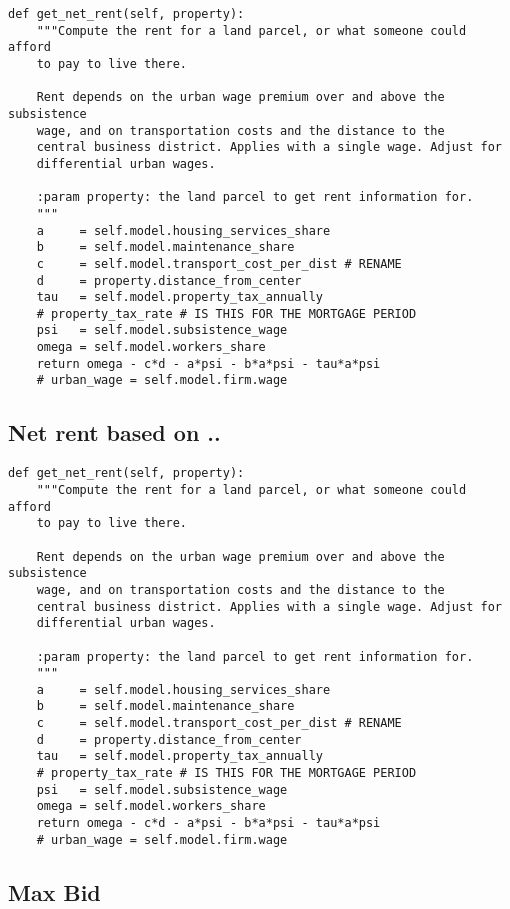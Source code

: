 \begin{lstlisting}
def get_net_rent(self, property):
    """Compute the rent for a land parcel, or what someone could afford
    to pay to live there. 

    Rent depends on the urban wage premium over and above the subsistence
    wage, and on transportation costs and the distance to the
    central business district. Applies with a single wage. Adjust for
    differential urban wages.

    :param property: the land parcel to get rent information for.
    """
    a     = self.model.housing_services_share
    b     = self.model.maintenance_share
    c     = self.model.transport_cost_per_dist # RENAME
    d     = property.distance_from_center 
    tau   = self.model.property_tax_annually 
    # property_tax_rate # IS THIS FOR THE MORTGAGE PERIOD
    psi   = self.model.subsistence_wage
    omega = self.model.workers_share
    return omega - c*d - a*psi - b*a*psi - tau*a*psi
    # urban_wage = self.model.firm.wage
\end{lstlisting}


\subsection{Net rent based on ..}

\begin{lstlisting}
def get_net_rent(self, property):
    """Compute the rent for a land parcel, or what someone could afford
    to pay to live there. 

    Rent depends on the urban wage premium over and above the subsistence
    wage, and on transportation costs and the distance to the
    central business district. Applies with a single wage. Adjust for
    differential urban wages.

    :param property: the land parcel to get rent information for.
    """
    a     = self.model.housing_services_share
    b     = self.model.maintenance_share
    c     = self.model.transport_cost_per_dist # RENAME
    d     = property.distance_from_center 
    tau   = self.model.property_tax_annually 
    # property_tax_rate # IS THIS FOR THE MORTGAGE PERIOD
    psi   = self.model.subsistence_wage
    omega = self.model.workers_share
    return omega - c*d - a*psi - b*a*psi - tau*a*psi
    # urban_wage = self.model.firm.wage
\end{lstlisting}

\subsection{Max Bid}

